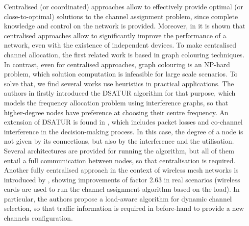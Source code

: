\documentclass[12pt, a4paper,twoside]{tesi_upf}
\begin{document}
		Centralised (or coordinated) approaches allow to effectively provide optimal (or close-to-optimal) solutions to the channel assignment problem, since complete knowledge and control on the network is provided. Moreover, in \cite{baid2015understanding} it is shown that centralised approaches allow to significantly improve the performance of a network, even with the existence of independent devices. To make centralised channel allocation, the first related work is based in graph colouring techniques. In contrast, even for centralised approaches, graph colouring is an NP-hard problem, which solution computation is infeasible for large scale scenarios. To solve that, we find several works use heuristics in practical applications. The authors in \cite{brelaz1979new} firstly introduced the DSATUR algorithm for that purpose, which models the frequency allocation problem using interference graphs, so that higher-degree nodes have preference at choosing their centre frequency. An extension of DSATUR is found in \cite{villegas2009frequency}, which includes packet losses and co-channel interference in the decision-making process. In this case, the degree of a node is not given by its connections, but also by the interference and the utilisation. Several architectures are provided for running the algorithm, but all of them entail a full communication between nodes, so that centralisation is required. Another fully centralised approach in the context of wireless mesh networks is introduced by \cite{raniwala2004centralized}, showing improvements of factor 2.63 in real scenarios (wireless cards are used to run the channel assignment algorithm based on the load). In particular, the authors propose a load-aware algorithm for dynamic channel selection, so that traffic information is required in before-hand to provide a new channels configuration. 
		
\end{document}
